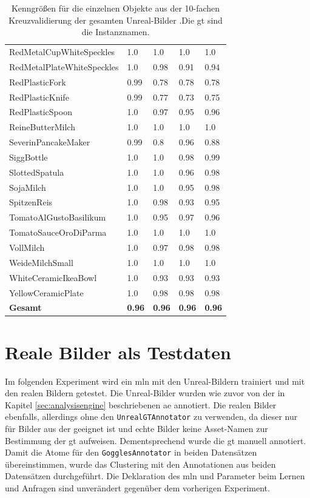 \begin{table}
\begin{tabularx}{\textwidth}{Xllll}
RedMetalCupWhiteSpeckles & 1.0 & 1.0 & 1.0 & 1.0 \\  
RedMetalPlateWhiteSpeckles & 1.0 & 0.98 & 0.91 & 0.94 \\  
RedPlasticFork & 0.99 & 0.78 & 0.78 & 0.78 \\  
RedPlasticKnife & 0.99 & 0.77 & 0.73 & 0.75 \\  
RedPlasticSpoon & 1.0 & 0.97 & 0.95 & 0.96 \\  
ReineButterMilch & 1.0 & 1.0 & 1.0 & 1.0 \\  
SeverinPancakeMaker & 0.99 & 0.8 & 0.96 & 0.88 \\  
SiggBottle & 1.0 & 1.0 & 0.98 & 0.99 \\  
SlottedSpatula & 1.0 & 1.0 & 0.96 & 0.98 \\  
SojaMilch & 1.0 & 1.0 & 0.95 & 0.98 \\  
SpitzenReis & 1.0 & 0.98 & 0.93 & 0.95 \\  
TomatoAlGustoBasilikum & 1.0 & 0.95 & 0.97 & 0.96 \\  
TomatoSauceOroDiParma & 1.0 & 1.0 & 1.0 & 1.0 \\  
VollMilch & 1.0 & 0.97 & 0.98 & 0.98 \\  
WeideMilchSmall & 1.0 & 1.0 & 1.0 & 1.0 \\  
WhiteCeramicIkeaBowl & 1.0 & 0.93 & 0.93 & 0.93 \\  
YellowCeramicPlate & 1.0 & 0.98 & 0.98 & 0.98 \\    \hline
\textbf{Gesamt}		&	\textbf{0.96}   &	\textbf{0.96}  & \textbf{0.96}     &  \textbf{0.96}     \\
\end{tabularx}
\caption[Objektinstanzen-spezifische Kenngrößen des gesamten Unreal-Bilder Datensatzes]{Kenngrößen für die einzelnen Objekte aus der 10-fachen Kreuzvalidierung der gesamten Unreal-Bilder .Die \gls{gt} sind die Instanznamen.}
\label{tab:UnrealGTInstance_metrics}
\end{table}

\section{Reale Bilder als Testdaten}

Im folgenden Experiment wird ein \gls{mln} mit den Unreal-Bildern trainiert und mit den realen Bildern getestet. Die Unreal-Bilder wurden wie zuvor von der in Kapitel \ref{sec:analysisengine} beschriebenen \gls{ae} annotiert. Die realen Bilder ebenfalls, allerdings ohne den \texttt{UnrealGTAnnotator} zu verwenden, da dieser nur für Bilder aus der \unreal geeignet ist und echte Bilder keine Asset-Namen zur Bestimmung der \gls{gt} aufweisen. Dementsprechend wurde die \gls{gt} manuell annotiert. Damit die Atome für den \texttt{GogglesAnnotator} in beiden Datensätzen übereinstimmen, wurde das Clustering mit den Annotationen aus beiden Datensätzen durchgeführt. Die Deklaration des \gls{mln} und Parameter beim Lernen und Anfragen sind unverändert gegenüber dem vorherigen Experiment. \par

